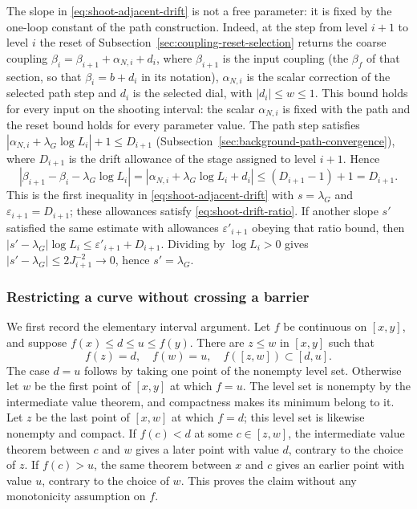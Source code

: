 The slope in \eqref{eq:shoot-adjacent-drift} is not a free parameter: it is
fixed by the one-loop constant of the path construction. Indeed, at the
step from level $i+1$ to level $i$ the reset of
Subsection~\ref{sec:coupling-reset-selection} returns the coarse coupling
$\beta_i=\beta_{i+1}+\alpha_{N,i}+d_i$, where $\beta_{i+1}$ is the input
coupling (the $\beta_f$ of that section, so that $\beta_i=b+d_i$ in its
notation), $\alpha_{N,i}$ is the scalar correction of the selected path step
and $d_i$ is the selected dial, with $|d_i|\le w\le1$.
This bound holds for every input on the shooting interval: the scalar
$\alpha_{N,i}$ is fixed with the path and the reset bound holds for every
parameter value. The path step
satisfies $|\alpha_{N,i}+\lambda_G\log L_i|+1\le D_{i+1}$
(Subsection~\ref{sec:background-path-convergence}), where $D_{i+1}$ is the
drift allowance of the stage assigned to level $i+1$. Hence
\[
 |\beta_{i+1}-\beta_i-\lambda_G\log L_i|
 =|\alpha_{N,i}+\lambda_G\log L_i+d_i|
 \le(D_{i+1}-1)+1=D_{i+1}.
\]
This is the first inequality in \eqref{eq:shoot-adjacent-drift} with
$s=\lambda_G$ and $\varepsilon_{i+1}=D_{i+1}$; these allowances satisfy
\eqref{eq:shoot-drift-ratio}. If another slope $s'$ satisfied the same
estimate with allowances $\varepsilon'_{i+1}$ obeying that ratio bound,
then $|s'-\lambda_G|\log L_i\leq\varepsilon'_{i+1}+D_{i+1}$.
Dividing by $\log L_i>0$ gives
$|s'-\lambda_G|\leq2J_{i+1}^{-2}\to0$, hence $s'=\lambda_G$.

\subsubsection{Restricting a curve without crossing a barrier}
We first record the elementary interval argument. Let $f$ be continuous
on $[x,y]$, and suppose
$f(x)\le d\le u\le f(y)$. There are $z\le w$ in $[x,y]$ such that
\[
 f(z)=d,\quad f(w)=u,\quad f([z,w])\subset[d,u].
\]
The case $d=u$ follows by taking one point of the nonempty level set.
Otherwise let $w$ be the first point of $[x,y]$ at which $f=u$.
The level set is nonempty by the intermediate value theorem, and
compactness makes its minimum belong to it. Let $z$ be the last point
of $[x,w]$ at which $f=d$; this level set is likewise nonempty and
compact. If $f(c)<d$ at some $c\in[z,w]$, the intermediate value
theorem between $c$ and $w$ gives a later point with value $d$,
contrary to the choice of $z$. If $f(c)>u$, the same theorem between
$x$ and $c$ gives an earlier point with value $u$, contrary to the
choice of $w$. This proves the claim without any monotonicity assumption
on $f$.

